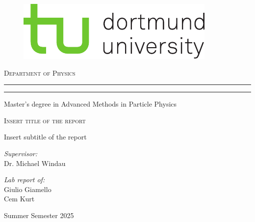 \begin{titlepage}
	
	\begin{figure}[ht]
		\vspace{-0.5cm} %
		\begin{center}
			\includegraphics[scale=1.50]{tud_logos/logo_tud_english.pdf}
		\end{center}
	\end{figure}

    \vspace{15mm} %
	
	\begin{center}
		{{\large{\textsc{Department of Physics}}}}
		\rule[0.1cm]{\linewidth}{0.3mm} %
		\rule[0.5cm]{\linewidth}{0.3mm} %
		Master’s degree in Advanced Methods in Particle Physics
	\end{center}
	
	\vspace{25mm} %
	\begin{center}
		\begin{Large}
			\textsc{Insert title of the report}
		\end{Large}
        
        \vspace{5mm} %
        Insert subtitle of the report
	\end{center}
	
	\vspace{45mm} %
	\noindent
	\begin{minipage}[t]{0.47\textwidth}
		{\large{\textit{Supervisor:}
        \\ Dr. Michael Windau}}
	\end{minipage}
	\hfill
	\begin{minipage}[t]{0.47\textwidth}\raggedleft
		{\large{\textit{Lab report of:}
        \\ Giulio Giamello
        \\Cem Kurt}}
	\end{minipage}
	\vfill
	\vspace{25mm}
	\begin{center}
		{\large{Summer Semester 2025}}
	\end{center}
	\vspace{-2cm}
	
\end{titlepage}

